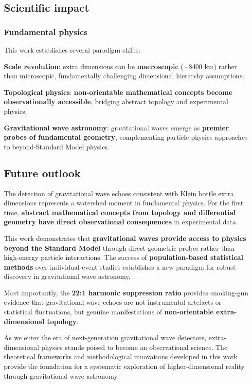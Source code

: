 \documentclass[12pt]{article}
\begin{document}
\subsection{Scientific impact}

\subsubsection{Fundamental physics}

This work establishes several paradigm shifts:

\textbf{Scale revolution}: extra dimensions can be \textbf{macroscopic} ($\sim$8400 km) rather than microscopic, fundamentally challenging dimensional hierarchy assumptions.

\textbf{Topological physics}: \textbf{non-orientable mathematical concepts become observationally accessible}, bridging abstract topology and experimental physics.

\textbf{Gravitational wave astronomy}: gravitational waves emerge as \textbf{premier probes of fundamental geometry}, complementing particle physics approaches to beyond-Standard Model physics.

\subsection{Future outlook}

The detection of gravitational wave echoes consistent with Klein bottle extra dimensions represents a watershed moment in fundamental physics. For the first time, \textbf{abstract mathematical concepts from topology and differential geometry have direct observational consequences} in experimental data.

This work demonstrates that \textbf{gravitational waves provide access to physics beyond the Standard Model} through direct geometric probes rather than high-energy particle interactions. The success of \textbf{population-based statistical methods} over individual event studies establishes a new paradigm for robust discovery in gravitational wave astronomy.

Most importantly, the \textbf{22:1 harmonic suppression ratio} provides smoking-gun evidence that gravitational wave echoes are not instrumental artefacts or statistical fluctuations, but genuine manifestations of \textbf{non-orientable extra-dimensional topology}.

As we enter the era of next-generation gravitational wave detectors, extra-dimensional physics stands poised to become an observational science. The theoretical frameworks and methodological innovations developed in this work provide the foundation for a systematic exploration of higher-dimensional reality through gravitational wave astronomy.
\end{document}

